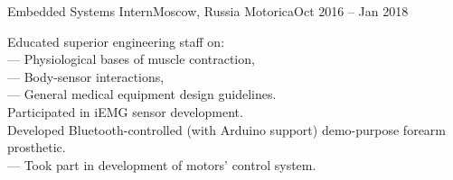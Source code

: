 \resumeSubheading
    {Embedded Systems Intern}{Moscow, Russia}
    {Motorica}{Oct 2016 -- Jan 2018}
    \begin{itemize}[leftmargin=0in, label={}]
        \small{\item{
            {Educated superior engineering staff on:}\\
            {— Physiological bases of muscle contraction,}\\
            {— Body-sensor interactions,}\\
            {— General medical equipment design guidelines.}\\
            {Participated in iEMG sensor development.}\\
            {Developed Bluetooth-controlled (with Arduino support) demo-purpose forearm prosthetic.}\\
            {— Took part in development of motors' control system.}
        }}
    \end{itemize}
